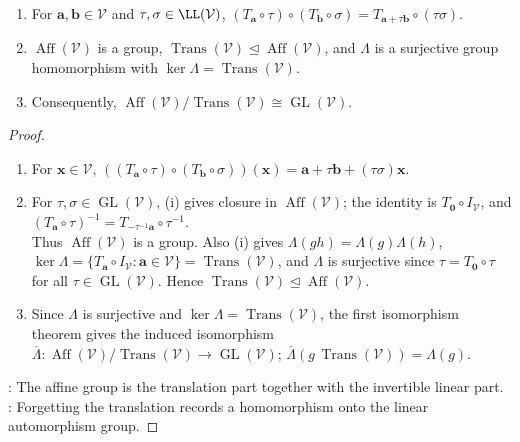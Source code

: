 \begin{corollary} \label{cor:affine-group-linear-part} 
\begin{enumerate}[label=(\roman*)]
\setlength{\itemsep}{0pt}
\item For $\mathbf{a},\mathbf{b}\in\mathcal{V}$ and $\tau,\sigma\in\LL(\mathcal{V})$, $(T_{\mathbf{a}}\circ\tau)\circ(T_{\mathbf{b}}\circ\sigma) =T_{\mathbf{a}+\tau\mathbf{b}}\circ(\tau\sigma)$.
\item $\operatorname{Aff}(\mathcal{V})$ is a group, $\operatorname{Trans}(\mathcal{V})\trianglelefteq\operatorname{Aff}(\mathcal{V})$, and $\Lambda$ is a surjective group homomorphism with $\ker\Lambda=\operatorname{Trans}(\mathcal{V})$.
\item Consequently, $\operatorname{Aff}(\mathcal{V})/\operatorname{Trans}(\mathcal{V})\cong\operatorname{GL}(\mathcal{V})$.
\end{enumerate}
\begin{proof}
\begin{enumerate}[label=\roman*.]
\setlength{\itemsep}{0pt}
\item For $\mathbf{x}\in\mathcal{V}$, $((T_{\mathbf{a}}\circ\tau)\circ(T_{\mathbf{b}}\circ\sigma))(\mathbf{x}) =\mathbf{a}+\tau\mathbf{b}+(\tau\sigma)\mathbf{x}$.
\item For $\tau,\sigma\in\operatorname{GL}(\mathcal{V})$, (i) gives closure in $\operatorname{Aff}(\mathcal{V})$; the identity is $T_{\mathbf{0}}\circ I_{\mathcal{V}}$, and $(T_{\mathbf{a}}\circ\tau)^{-1}=T_{-\tau^{-1}\mathbf{a}}\circ\tau^{-1}$.\\
Thus $\operatorname{Aff}(\mathcal{V})$ is a group. Also (i) gives $\Lambda(gh)=\Lambda(g)\Lambda(h)$, $\ker\Lambda=\{T_{\mathbf{a}}\circ I_{\mathcal{V}}:\mathbf{a}\in\mathcal{V}\}=\operatorname{Trans}(\mathcal{V})$, and $\Lambda$ is surjective since $\tau=T_{\mathbf{0}}\circ\tau$ for all $\tau\in\operatorname{GL}(\mathcal{V})$. Hence $\operatorname{Trans}(\mathcal{V})\trianglelefteq\operatorname{Aff}(\mathcal{V})$.
\item Since $\Lambda$ is surjective and $\ker\Lambda=\operatorname{Trans}(\mathcal{V})$, the first isomorphism theorem gives the induced isomorphism\\
$\overline{\Lambda}:\operatorname{Aff}(\mathcal{V})/\operatorname{Trans}(\mathcal{V})\to\operatorname{GL}(\mathcal{V})$; $\overline{\Lambda}(g\,\operatorname{Trans}(\mathcal{V}))=\Lambda(g)$.
\end{enumerate}
: The affine group is the translation part together with the invertible linear part.\\
: Forgetting the translation records a homomorphism onto the linear automorphism group.
\end{proof}
\end{corollary}

